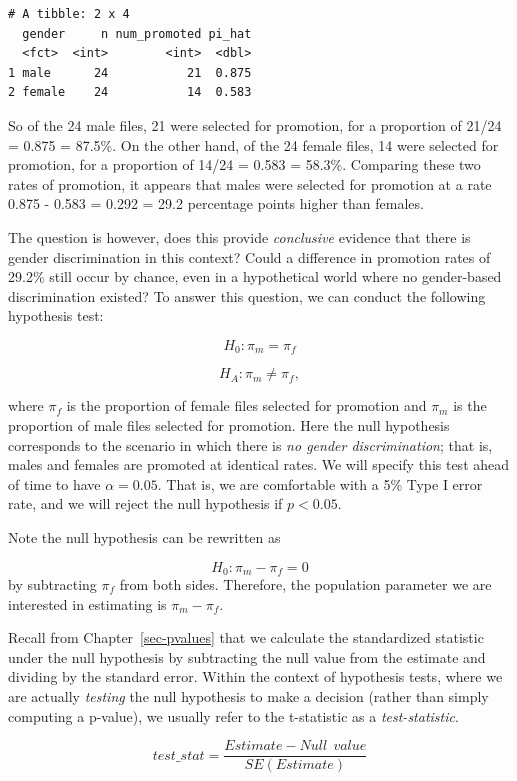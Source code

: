 \documentclass[
  letterpaper,
  DIV=11,
  numbers=noendperiod]{scrreprt}
\theoremstyle{definition}
\theoremstyle{remark}
\begin{document}
\begin{verbatim}
# A tibble: 2 x 4
  gender     n num_promoted pi_hat
  <fct>  <int>        <int>  <dbl>
1 male      24           21  0.875
2 female    24           14  0.583
\end{verbatim}

So of the 24 male files, 21 were selected for promotion, for a
proportion of 21/24 = 0.875 = 87.5\%. On the other hand, of the 24
female files, 14 were selected for promotion, for a proportion of 14/24
= 0.583 = 58.3\%. Comparing these two rates of promotion, it appears
that males were selected for promotion at a rate 0.875 - 0.583 = 0.292 =
29.2 percentage points higher than females.

The question is however, does this provide \emph{conclusive} evidence
that there is gender discrimination in this context? Could a difference
in promotion rates of 29.2\% still occur by chance, even in a
hypothetical world where no gender-based discrimination existed? To
answer this question, we can conduct the following hypothesis test:

\[H_0: \pi_m = \pi_f\]

\[H_A: \pi_m \neq \pi_f,\]

where \(\pi_f\) is the proportion of female files selected for promotion
and \(\pi_m\) is the proportion of male files selected for promotion.
Here the null hypothesis corresponds to the scenario in which there is
\emph{no gender discrimination}; that is, males and females are promoted
at identical rates. We will specify this test ahead of time to have
\(\alpha = 0.05\). That is, we are comfortable with a 5\% Type I error
rate, and we will reject the null hypothesis if \(p < 0.05\).

Note the null hypothesis can be rewritten as

\[H_0: \pi_m - \pi_f = 0\] by subtracting \(\pi_f\) from both sides.
Therefore, the population parameter we are interested in estimating is
\(\pi_m - \pi_f\).

Recall from Chapter~\ref{sec-pvalues} that we calculate the standardized
statistic under the null hypothesis by subtracting the null value from
the estimate and dividing by the standard error. Within the context of
hypothesis tests, where we are actually \emph{testing} the null
hypothesis to make a decision (rather than simply computing a p-value),
we usually refer to the t-statistic as a \emph{test-statistic}.

\[test\_stat = \frac{Estimate - Null \ \ value}{SE(Estimate)}\]
\end{document}
